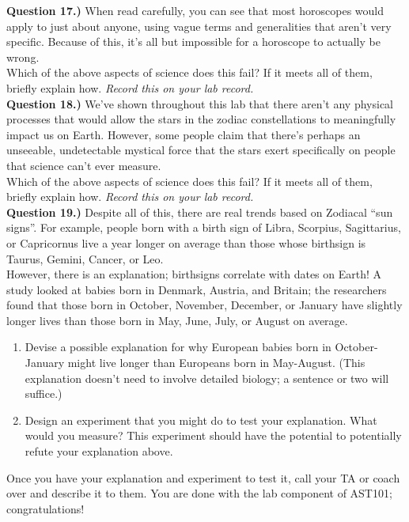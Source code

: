 \documentclass[11pt]{article}
\begin{document}
\textbf{Question 17.)} When read carefully, you can see that most horoscopes would apply to just about anyone, using vague terms and generalities that aren't very specific. Because of this, it's all but impossible for a horoscope to actually be wrong.\\

Which of the above aspects of science does this fail? If it meets all of them, briefly explain how. {\it Record this on your lab record.}\\



\textbf{Question 18.)} We've shown throughout this lab that there aren't any physical processes that would allow the stars in the zodiac constellations to meaningfully impact us on Earth. However, some people claim that there's perhaps an unseeable, undetectable mystical force that the stars exert specifically on people that science can't ever measure.\\

Which of the above aspects of science does this fail? If it meets all of them, briefly explain how. {\it Record this on your lab record.}	\\
%

\textbf{Question 19.)} Despite all of this, there {\it} are real trends based on Zodiacal ``sun signs''. For example, people born with a birth sign of Libra, Scorpius, Sagittarius, or Capricornus live a year longer on average than those whose birthsign is Taurus, Gemini, Cancer, or Leo.\\

However, there is an explanation; birthsigns correlate with dates on Earth! A study looked at babies born in Denmark, Austria, and Britain; the researchers found that those born in October, November, December, or January have slightly longer lives than those born in May, June, July, or August on average.



\bigskip


\begin{enumerate}
	\item Devise a possible explanation for why European babies born in October-January might live longer than Europeans born in May-August. (This explanation doesn't need to involve detailed biology; a sentence or two will suffice.)
	\item Design an experiment that you might do to test your explanation. What would you measure? This experiment should have the potential to potentially refute your explanation above.
\end{enumerate}

Once you have your explanation and experiment to test it, call your TA or coach over and describe it to them. You are done with the lab component of AST101; congratulations!

\vspace{1.5cm}
\hrulefill
\end{document}
